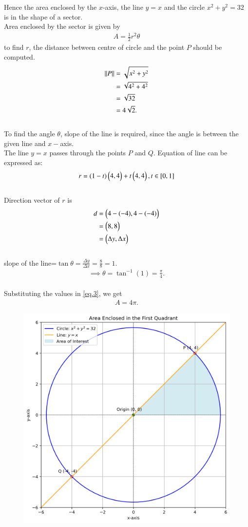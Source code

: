 \documentclass[journal,12pt,onecolumn]{IEEEtran}
\theoremstyle{remark}
\begin{document}
Hence the area enclosed by the $x$-axis, the line $y = x$ and
the circle $x^2 + y^2 = 32$ is in the shape of a sector. \\ Area enclosed by the sector is given by 
\begin{align}
    A= \frac{1}{2}r^2\theta 
    \label{eq.3}
\end{align}
to find $r$, the distance between centre of circle and the point $P$ should be computed.\\
 \begin{align*}\left\lVert P\right\rVert&=\sqrt{x^2+y^2} \\ &=\sqrt{4^2+4^2} \\ &=\sqrt{32} \\ &=4\sqrt{2}.\end{align*}\\
 To find the angle $\theta$, slope of the line is required, since the angle is between the given line and $x-$axis.\\ The line $y=x$ passes through the points $P$ and $Q$. Equation of line can be expressed as:\\
  \begin{align*} r = (1-t) \begin{pmatrix}4,4\end{pmatrix}+ t
  \begin{pmatrix}4,4\end{pmatrix}, t\in [0,1]\end{align*}\\
  Direction vector of $r$ is \\
   \begin{align*} d&= \begin{pmatrix}4-(-4),4-(-4)\end{pmatrix} \\ &= \begin{pmatrix}8,8\end{pmatrix} \\ &=\begin{pmatrix}\Delta y , \Delta x \end{pmatrix}\end{align*} \\
   slope of the line=$\tan \theta = \frac{\Delta y}{\Delta x} =\frac{8}{8}=1.$\\
   \begin{align*}
       \implies \theta = \tan^{-1}(1)= \frac{\pi}{4}.
   \end{align*} \\Substituting the values in \ref{eq.3}, we get \begin{align*}
     A=4\pi.  
   \end{align*}


\begin{figure}[ht!]
   \centering
   \includegraphics[width=0.7\linewidth]{circlenline.png}
    \label{stemplot}
\end{figure}


   
\end{document}
